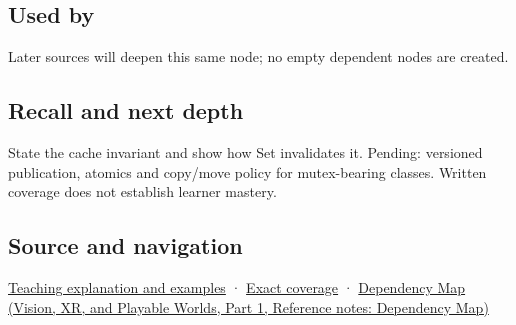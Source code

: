 \subsection{Used by}\label{appendix-f5593256bcaf-used-by}

\hypertarget{appendix-f5593256bcaf-used-by}{}

Later sources will deepen this same node; no empty dependent nodes are created.

\subsection{Recall and next depth}\label{appendix-f5593256bcaf-recall-and-next-depth}

\hypertarget{appendix-f5593256bcaf-recall-and-next-depth}{}

State the cache invariant and show how Set invalidates it. Pending: versioned publication, atomics and copy/move policy for mutex-bearing classes. Written coverage does not establish learner mastery.

\subsection{Source and navigation}\label{appendix-f5593256bcaf-source-and-navigation}

\hypertarget{appendix-f5593256bcaf-source-and-navigation}{}

\hyperref[01-foundations-i-ch003-a-cache-may-change-bits-without-changing-meaning]{Teaching explanation and examples} · \hyperref[appendix-fd090d982a15-m008---parts-113-126]{Exact coverage} · \href{../07-Vision-XR-and-Playable-Worlds-P01/main.pdf\#appendix-4ad47bdd269a}{Dependency Map (Vision, XR, and Playable Worlds, Part 1, Reference notes: Dependency Map)}
